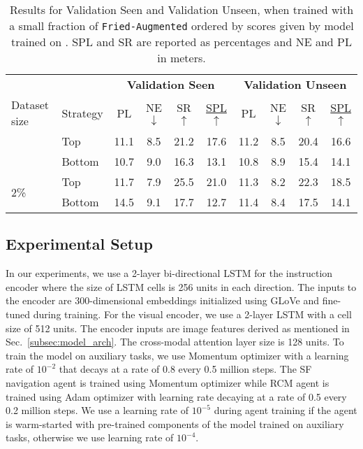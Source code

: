 \documentclass[10pt,twocolumn,letterpaper]{article}
\newcommand{\friedaug}{\texttt{Fried-Augmented}}
\begin{document}
\begin{table*}
\centering
\setlength\tabcolsep{4.5pt}
\begin{tabular}{llcccccccc}\\[-0.8em]
                              &  & \multicolumn{4}{c}{\textbf{Validation Seen}} & \multicolumn{4}{c}{\textbf{Validation Unseen}}\\\cmidrule(lr{0.1cm}){3-6}\cmidrule(l{0.1cm}){7-10}
Dataset size & Strategy                            & PL    & NE $\downarrow$   & SR $\uparrow$   & \underline{SPL} $\uparrow$  & PL    & NE $\downarrow$   & SR $\uparrow$   & \underline{SPL} $\uparrow$   \\[0.2em]\Xhline{2\arrayrulewidth}            
\multirow{2}{*}{1\%}   & Top                   & 11.1 & 8.5 & 21.2 & 17.6 & 11.2 & 8.5 & 20.4 & 16.6  \\
                       & Bottom                & 10.7 & 9.0 & 16.3 & 13.1 & 10.8 & 8.9 & 15.4 & 14.1  \\
\hline 
\multirow{2}{*}{2\%}   & Top                   & 11.7 & 7.9 & 25.5 & 21.0 & 11.3 & 8.2 & 22.3 & 18.5 \\
                       & Bottom                & 14.5 & 9.1 & 17.7 & 12.7 & 11.4 & 8.4 & 17.5 & 14.1  \\   
\end{tabular}
\caption{Results for Validation Seen and Validation Unseen, when trained with a small fraction of {\friedaug} ordered by scores given by model trained on {\taskcma}. SPL and SR are reported as percentages and NE and PL in meters.}
\label{tab:r2r-small-dataset}
\end{table*}


\subsection{Experimental Setup}
In our experiments, we use a 2-layer bi-directional LSTM for the instruction encoder where the size of LSTM cells is 256 units in each direction. The inputs to the encoder are 300-dimensional embeddings initialized using GLoVe and fine-tuned during training. For the visual encoder, we use a 2-layer LSTM with a cell size of 512 units. The encoder inputs are image features derived as mentioned in Sec.~\ref{subsec:model_arch}. The cross-modal attention layer size is 128 units. To train the model on auxiliary tasks, we use Momentum optimizer with a learning rate of $10^{-2}$ that decays at a rate of 0.8 every 0.5 million steps. The SF navigation agent is trained using Momentum optimizer while RCM agent is trained using Adam optimizer with learning rate decaying at a rate of 0.5 every 0.2 million steps. We use a learning rate of $10^{-5}$ during agent training if the agent is warm-started with pre-trained components of the model trained on auxiliary tasks, otherwise we use learning rate of $10^{-4}$.
\end{document}
